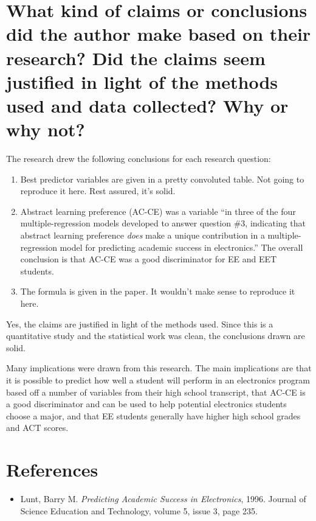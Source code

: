 \documentclass[12pt]{article}
\begin{document}
\section{What kind of claims or conclusions did the author make based on their research? Did the claims seem justified in light of the methods used and data collected? Why or why not?}
The research drew the following conclusions for each research question:
\begin{enumerate}
    \item Best predictor variables are given in a pretty convoluted table. Not going to reproduce it here. Rest assured, it's solid.
    \item Abstract learning preference (AC-CE) was a variable ``in three of the four multiple-regression models developed to answer question \#3, indicating that abstract learning preference \emph{does} make a unique contribution in a multiple-regression model for predicting academic success in electronics.'' The overall conclusion is that AC-CE was a good discriminator for EE and EET students.
    \item The formula is given in the paper. It wouldn't make sense to reproduce it here.
\end{enumerate}

Yes, the claims are justified in light of the methods used. Since this is a quantitative study and the statistical work was clean, the conclusions drawn are solid.

Many implications were drawn from this research. The main implications are that it is possible to predict how well a student will perform in an electronics program based off a number of variables from their high school transcript, that AC-CE is a good discriminator and can be used to help potential electronics students choose a major, and that EE students generally have higher high school grades and ACT scores.

\section{References}
\begin{itemize}
    \item Lunt, Barry M. \textit{Predicting Academic Success in Electronics}, 1996. Journal of Science Education and Technology, volume 5, issue 3, page 235.
\end{itemize}
\end{document}
